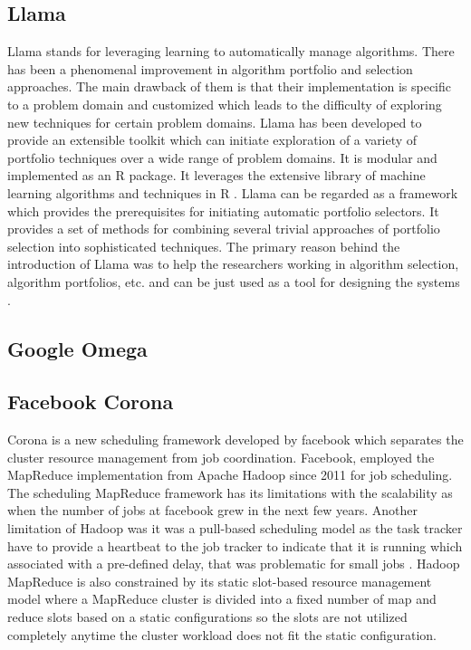 \subsection{ Llama}

     Llama stands for leveraging learning to automatically manage
     algorithms. There has been a phenomenal improvement in algorithm
     portfolio and selection approaches. The main drawback of them is
     that their implementation is specific to a problem domain and
     customized which leads to the difficulty of exploring new
     techniques for certain problem domains. Llama has been developed
     to provide an extensible toolkit which can initiate exploration
     of a variety of portfolio techniques over a wide range of problem
     domains. It is modular and implemented as an R package. It
     leverages the extensive library of machine learning algorithms
     and techniques in R \cite{lla1}. Llama can be regarded as a
     framework which provides the prerequisites for initiating
     automatic portfolio selectors. It provides a set of methods for
     combining several trivial approaches of portfolio selection into
     sophisticated techniques. The primary reason behind the
     introduction of Llama was to help the researchers working in
     algorithm selection, algorithm portfolios, etc. and can be just
     used as a tool for designing the systems \cite{lla1}.
     
\subsection{ Google Omega}
\subsection{ Facebook Corona}

     Corona is a new scheduling framework developed by facebook which
     separates the cluster resource management from job coordination.
     Facebook, employed the MapReduce implementation from Apache
     Hadoop since 2011 for job scheduling. The scheduling MapReduce
     framework has its limitations with the scalability as when the
     number of jobs at facebook grew in the next few years. Another
     limitation of Hadoop was it was a pull-based scheduling model as
     the task tracker have to provide a heartbeat to the job tracker to
     indicate that it is running which associated with a pre-defined
     delay, that was problematic for small jobs 
     \cite{www-facebook-corona}. Hadoop MapReduce is also constrained
     by its static slot-based resource management model where a
     MapReduce cluster is divided into a fixed number of map and
     reduce slots based on a static configurations so the slots are
     not utilized completely anytime the cluster workload does not fit
     the static configuration.

